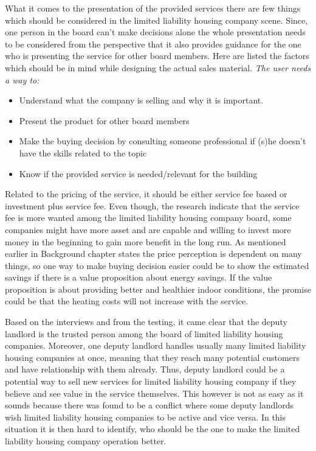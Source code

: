 What it comes to the presentation of the provided services there are few things which should be considered in the limited liability housing company scene. Since, one person in the board can't make decisions alone the whole presentation needs to be considered from the perspective that it also provides guidance for the one who is presenting the service for other board members. Here are listed the factors which should be in mind while designing the actual sales material. \emph{The user needs a way to:}
\begin{itemize}
\item Understand what the company is selling and why it is important.
\item Present the product for other board members
\item Make the buying decision by consulting someone professional if (s)he doesn't have the skills related to the topic
\item Know if the provided service is needed/relevant for the building
\end{itemize}

Related to the pricing of the service, it should be either service fee based or investment plus service fee. Even though, the research indicate that the service fee is more wanted among the limited liability housing company board, some companies might have more asset and are capable and willing to invest more money in the beginning to gain more benefit in the long run. As mentioned earlier in Background chapter \textcite{Decoded:2013} states the price perception is dependent on many things, so one way to make buying decision easier could be to show the estimated savings if there is a value proposition about energy savings. If the value proposition is about providing better and healthier indoor conditions, the promise could be that the heating costs will not increase with the service.

Based on the interviews and from the testing, it came clear that the deputy landlord is the trusted person among the board of limited liability housing companies. Moreover, one deputy landlord handles usually many limited liability housing companies at once, meaning that they reach many potential customers and have relationship with them already. Thus, deputy landlord could be a potential way to sell new services for limited liability housing company if they believe and see value in the service themselves. This however is not as easy as it sounds because there was found to be a conflict where some deputy landlords wish limited liability housing companies to be active and vice versa. In this situation it is then hard to identify, who should be the one to make the limited liability housing company operation better.

